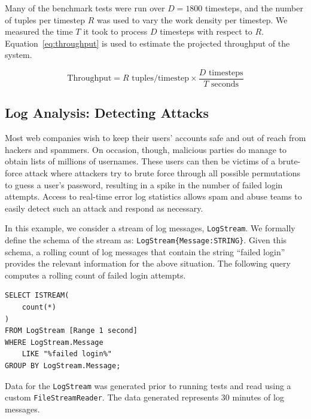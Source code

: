 \documentclass[a4paper, 10pt, conference]{IEEEconf}
\begin{document}
Many of the benchmark tests were run over $D = 1800$ timesteps, and the number of tuples per timestep $R$ was used to vary the work density per timestep.  We measured the time $T$ it took to process $D$ timesteps with respect to $R$.  Equation~\ref{eq:throughput} is used to estimate the projected throughput of the system.

\begin{equation} \label{eq:throughput}
    \text{Throughput} = R \text{ tuples/timestep} \times \dfrac{D \text{ timesteps}}{T \text{ seconds}}
\end{equation}

\subsection{Log Analysis: Detecting Attacks}
Most web companies wish to keep their users' accounts safe and out of reach from hackers and spammers.  On occasion, though, malicious parties do manage to obtain lists of millions of usernames.  These users can then be victims of a brute-force attack where attackers try to brute force through all possible permutations to guess a user's password, resulting in a spike in the number of failed login attempts. Access to real-time error log statistics allows spam and abuse teams to easily detect such an attack and respond as necessary.

In this example, we consider a stream of log messages, \texttt{LogStream}. We formally define the schema of the stream as: \texttt{LogStream\{Message:STRING\}}. Given this schema, a rolling count of log messages that contain the string ``failed login'' provides the relevant information for the above situation.  The following query computes a rolling count of failed login attempts.

\begin{lstlisting}
SELECT ISTREAM(
    count(*)
)
FROM LogStream [Range 1 second]
WHERE LogStream.Message
	LIKE "%failed login%"
GROUP BY LogStream.Message;
\end{lstlisting}

Data for the \texttt{LogStream} was generated prior to running tests and read using a custom \texttt{FileStreamReader}.  The data generated represents 30 minutes of log messages.
\end{document}
